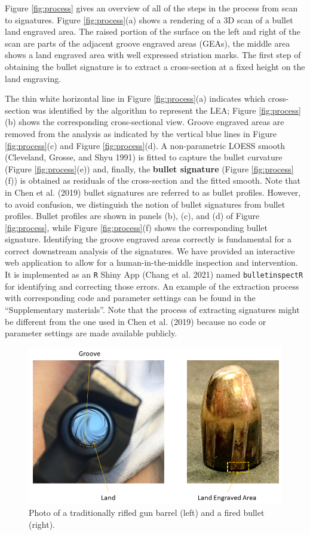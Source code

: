 Figure \ref{fig:process} gives an overview of all of the steps in the process from scan to signatures.
Figure \ref{fig:process}(a) shows a rendering of a 3D scan of a bullet land engraved area.
The raised portion of the surface on the left and right of the scan are parts of the adjacent groove engraved areas (GEAs), the middle area shows a land engraved area with well expressed striation marks.
The first step of obtaining the bullet signature is to extract a cross-section at a fixed height on the land engraving.

The thin white horizontal line in Figure \ref{fig:process}(a) indicates which cross-section was identified by the algorithm to represent the LEA; Figure \ref{fig:process}(b) shows the corresponding cross-sectional view.
Groove engraved areas are removed from the analysis as indicated by the vertical blue lines in Figure \ref{fig:process}(c) and Figure \ref{fig:process}(d).
A non-parametric LOESS smooth (Cleveland, Grosse, and Shyu 1991) is fitted to capture the bullet curvature (Figure \ref{fig:process}(e)) and, finally, the \textbf{bullet signature} (Figure \ref{fig:process}(f)) is obtained as residuals of the cross-section and the fitted smooth.
Note that in Chen et al. (2019) bullet signatures are referred to as bullet profiles.
However, to avoid confusion, we distinguish the notion of bullet signatures from bullet profiles.
Bullet profiles are shown in panels (b), (c), and (d) of Figure \ref{fig:process}, while Figure \ref{fig:process}(f) shows the corresponding bullet signature.
Identifying the groove engraved areas correctly is fundamental for a correct downstream analysis of the signatures.
We have provided an interactive web application to allow for a human-in-the-middle inspection and intervention. It is implemented as an \texttt{R} Shiny App (Chang et al. 2021) named \texttt{bulletinspectR} for identifying and correcting those errors.
An example of the extraction process with corresponding code and parameter settings can be found in the ``Supplementary materials''. Note that the process of extracting signatures might be different from the one used in Chen et al. (2019) because no code or parameter settings are made available publicly.

\begin{figure}

{\centering \includegraphics[width=.8\textwidth]{img/barrel_bullet_ps} 

}

\caption{Photo of a traditionally rifled gun barrel (left) and a fired bullet (right).}\label{fig:bullet}
\end{figure}

